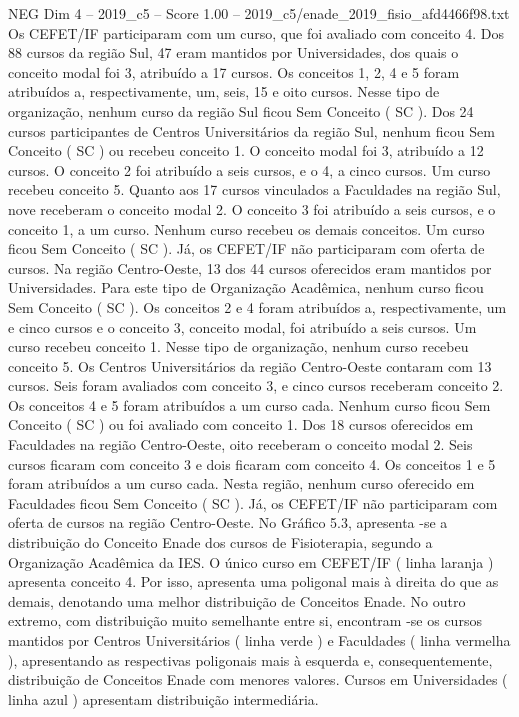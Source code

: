 \begin{textsample}{NEG Dim 4 – 2019\_c5 – Score 1.00 – 2019\_c5/enade\_2019\_fisio\_afd4466f98.txt}
Os CEFET/IF participaram com um curso, que foi avaliado com conceito 4.
Dos 88 cursos da região Sul, 47 eram mantidos por Universidades, dos quais o conceito modal foi 3, atribuído a 17 cursos.
Os conceitos 1, 2, 4 e 5 foram atribuídos a, respectivamente, um, seis, 15 e oito cursos.
Nesse tipo de organização, nenhum curso da região Sul ficou Sem Conceito ( SC ).
Dos 24 cursos participantes de Centros Universitários da região Sul, nenhum ficou Sem Conceito ( SC ) ou recebeu conceito 1.
O conceito modal foi 3, atribuído a 12 cursos.
O conceito 2 foi atribuído a seis cursos, e o 4, a cinco cursos.
Um curso recebeu conceito 5.
Quanto aos 17 cursos vinculados a Faculdades na região Sul, nove receberam o conceito modal 2.
O conceito 3 foi atribuído a seis cursos, e o conceito 1, a um curso.
Nenhum curso recebeu os demais conceitos.
Um curso ficou Sem Conceito ( SC ).
Já, os CEFET/IF não participaram com oferta de cursos.
Na região Centro-Oeste, 13 dos 44 cursos oferecidos eram mantidos por Universidades.
Para este tipo de Organização Acadêmica, nenhum curso ficou Sem Conceito ( SC ).
Os conceitos 2 e 4 foram atribuídos a, respectivamente, um e cinco cursos e o conceito 3, conceito modal, foi atribuído a seis cursos.
Um curso recebeu conceito 1.
Nesse tipo de organização, nenhum curso recebeu conceito 5.
Os Centros Universitários da região Centro-Oeste contaram com 13 cursos.
Seis foram avaliados com conceito 3, e cinco cursos receberam conceito 2.
Os conceitos 4 e 5 foram atribuídos a um curso cada.
Nenhum curso ficou Sem Conceito ( SC ) ou foi avaliado com conceito 1.
Dos 18 cursos oferecidos em Faculdades na região Centro-Oeste, oito receberam o conceito modal 2.
Seis cursos ficaram com conceito 3 e dois ficaram com conceito 4.
Os conceitos 1 e 5 foram atribuídos a um curso cada.
Nesta região, nenhum curso oferecido em Faculdades ficou Sem Conceito ( SC ).
Já, os CEFET/IF não participaram com oferta de cursos na região Centro-Oeste.
No Gráfico 5.3, apresenta -se a distribuição do Conceito Enade dos cursos de Fisioterapia, segundo a Organização Acadêmica da IES.
O único curso em CEFET/IF ( linha laranja ) apresenta conceito 4.
Por isso, apresenta uma poligonal mais à direita do que as demais, denotando uma melhor distribuição de Conceitos Enade.
No outro extremo, com distribuição muito semelhante entre si, encontram -se os cursos mantidos por Centros Universitários ( linha verde ) e Faculdades ( linha vermelha ), apresentando as respectivas poligonais mais à esquerda e, consequentemente, distribuição de Conceitos Enade com menores valores.
Cursos em Universidades ( linha azul ) apresentam distribuição intermediária.

\end{textsample}
